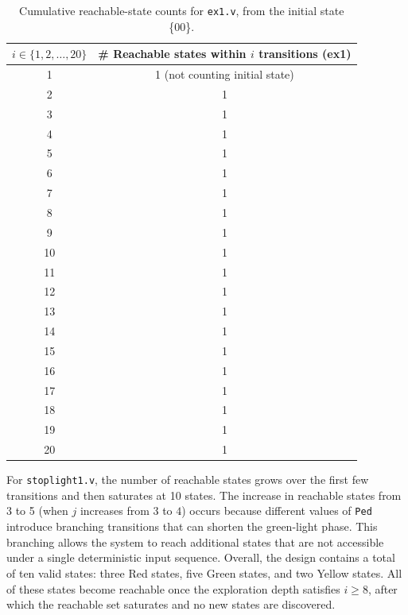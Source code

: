 \documentclass[10pt]{article}
\begin{document}
\begin{table}[H]
\centering
\begin{tabular}{c|c}
\toprule
$i \in \{1,2,\dots,20\}$ & \# Reachable states within $i$ transitions (ex1) \\
\midrule
1  & 1 (not counting initial state) \\
2  & 1 \\
3  & 1 \\
4  & 1 \\
5  & 1 \\
6  & 1 \\
7  & 1 \\
8  & 1 \\
9  & 1 \\
10 & 1 \\
11 & 1 \\
12 & 1 \\
13 & 1 \\
14 & 1 \\
15 & 1 \\
16 & 1 \\
17 & 1 \\
18 & 1 \\
19 & 1 \\
20 & 1 \\
\bottomrule
\end{tabular}
\caption{Cumulative reachable-state counts for \texttt{ex1.v}, from the initial state \{00\}.}
\label{tab:a3_ex1}
\end{table}


For \texttt{stoplight1.v}, the number of reachable states grows over the first few transitions and then saturates at 10 states.
The increase in reachable states from 3 to 5 (when $j$ increases from $3$ to $4$) occurs because different values of \texttt{Ped} introduce branching transitions that can shorten the green-light phase. This branching allows the system to reach additional states that are not accessible under a single deterministic input sequence. Overall, the design contains a total of ten valid states: three Red states, five Green states, and two Yellow states. All of these states become reachable once the exploration depth satisfies $i \ge 8$, after which the reachable set saturates and no new states are discovered.
\end{document}

